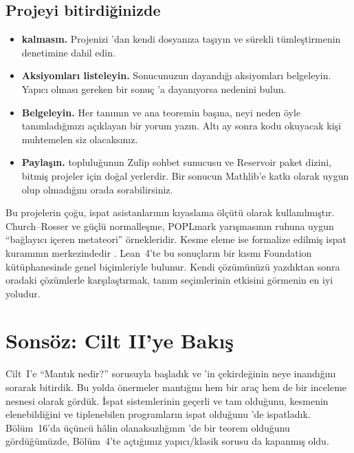 \section{Projeyi bitirdiğinizde}\label{sec:proje-bitis}

\begin{itemize}
  \item \textbf{ kalmasın.} Projenizi 'dan
        kendi dosyanıza taşıyın ve sürekli tümleştirmenin 
        denetimine dahil edin.
  \item \textbf{Aksiyomları listeleyin.} Sonucunuzun dayandığı aksiyomları
        belgeleyin. Yapıcı olması gereken bir sonuç 'a
        dayanıyorsa nedenini bulun.
  \item \textbf{Belgeleyin.} Her tanımın ve ana teoremin başına,
        neyi neden öyle tanımladığınızı açıklayan bir yorum yazın. Altı ay
        sonra kodu okuyacak kişi muhtemelen siz olacaksınız.
  \item \textbf{Paylaşın.} \Lean{} topluluğunun Zulip sohbet sunucusu ve
        Reservoir paket dizini, bitmiş projeler için doğal yerlerdir. Bir
        sonucun Mathlib'e katkı olarak uygun olup olmadığını orada
        sorabilirsiniz.
\end{itemize}

\begin{arastirmanotu}
Bu projelerin çoğu, ispat asistanlarının kıyaslama ölçütü olarak
kullanılmıştır. Church--Rosser ve güçlü normalleşme, POPLmark yarışmasının
\citep{aydemir2005} ruhuna uygun ``bağlayıcı içeren metateori''
örnekleridir. Kesme eleme ise formalize edilmiş ispat kuramının merkezindedir
\citep{chaudhuri2019,shillito2023}. Lean~4'te bu sonuçların bir kısmı
Foundation kütüphanesinde \citep{foundation} genel biçimleriyle bulunur.
Kendi çözümünüzü yazdıktan sonra oradaki çözümlerle karşılaştırmak,
tanım seçimlerinin etkisini görmenin en iyi yoludur.
\end{arastirmanotu}

\chapter*{Sonsöz: Cilt II'ye Bakış}

Cilt~I'e ``Mantık nedir?'' sorusuyla başladık ve \Lean{}'in çekirdeğinin
neye inandığını sorarak bitirdik. Bu yolda önermeler mantığını hem bir
araç hem de bir inceleme nesnesi olarak gördük. İspat sistemlerinin
geçerli ve tam olduğunu, kesmenin elenebildiğini ve tiplenebilen
programların ispat olduğunu \Lean{}'de ispatladık. Bölüm~16'da üçüncü hâlin
olanaksızlığının \Lean{}'de bir teorem olduğunu gördüğümüzde, Bölüm~4'te
açtığımız yapıcı/klasik sorusu da kapanmış oldu.

